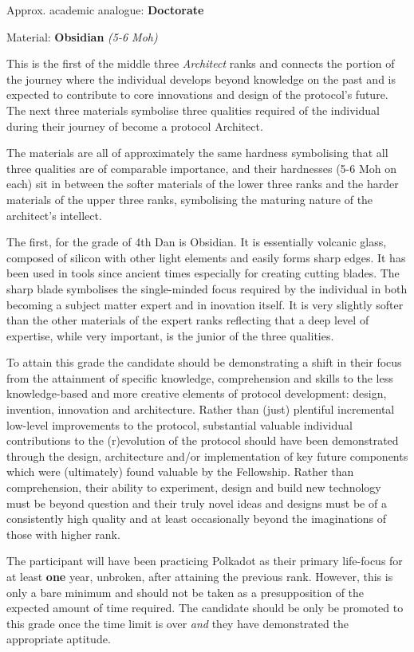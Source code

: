 \documentclass[9pt,oneside]{amsart}
\begin{document}

Approx. academic analogue: \textbf{Doctorate}

Material: \textbf{Obsidian} \emph{(5-6 Moh)}

This is the first of the middle three \emph{Architect} ranks and connects the portion of the journey where the individual develops beyond knowledge on the past and is expected to contribute to core innovations and design of the protocol's future. The next three materials symbolise three qualities required of the individual during their journey of become a protocol Architect.

The materials are all of approximately the same hardness symbolising that all three qualities are of comparable importance, and their hardnesses (5-6 Moh on each) sit in between the softer materials of the lower three ranks and the harder materials of the upper three ranks, symbolising the maturing nature of the architect's intellect.

The first, for the grade of 4th Dan is Obsidian. It is essentially volcanic glass, composed of silicon with other light elements and easily forms sharp edges. It has been used in tools since ancient times especially for creating cutting blades. The sharp blade symbolises the single-minded focus required by the individual in both becoming a subject matter expert and in inovation itself. It is very slightly softer than the other materials of the expert ranks reflecting that a deep level of expertise, while very important, is the junior of the three qualities.

To attain this grade the candidate should be demonstrating a shift in their focus from the attainment of specific knowledge, comprehension and skills to the less knowledge-based and more creative elements of protocol development: design, invention, innovation and architecture. Rather than (just) plentiful incremental low-level improvements to the protocol, substantial valuable individual contributions to the (r)evolution of the protocol should have been demonstrated through the design, architecture and/or implementation of key future components which were (ultimately) found valuable by the Fellowship. Rather than comprehension, their ability to experiment, design and build new technology must be beyond question and their truly novel ideas and designs must be of a consistently high quality and at least occasionally beyond the imaginations of those with higher rank.

The participant will have been practicing Polkadot as their primary life-focus for at least \textbf{one} year, unbroken, after attaining the previous rank. However, this is only a bare minimum and should not be taken as a presupposition of the expected amount of time required. The candidate should be only be promoted to this grade once the time limit is over \emph{and} they have demonstrated the appropriate aptitude.
\end{document}
